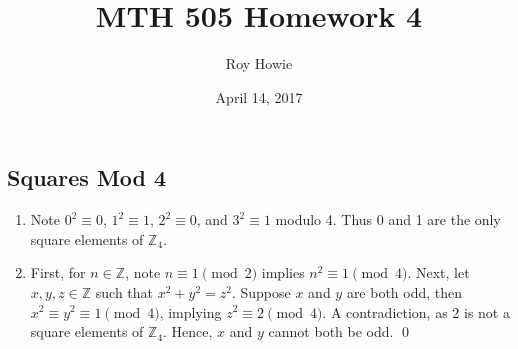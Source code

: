 \documentclass{article}
\newcommand{\Z}{\mathbb{Z}}
\begin{document}
\title{\vspace{-2cm}MTH 505 Homework 4}
\author{Roy Howie}
\date{April 14, 2017}
\maketitle

\subsection{Squares Mod 4}
  \begin{enumerate}[label=\textbf{(\alph*)}]
    \item{
      Note $0^2\equiv0$, $1^2\equiv1$, $2^2\equiv0$, and $3^2\equiv1$ modulo 4.
      Thus 0 and 1 are the only square elements of $\Z_4$.
    }
    \item{
      First, for $n\in\Z$, note $n\equiv1\pmod{2}$ implies $n^2\equiv1\pmod{4}$.
      Next, let $x,y,z\in\Z$ such that $x^2+y^2=z^2$. Suppose $x$ and $y$ are
      both odd, then $x^2\equiv y^2\equiv1\pmod{4}$, implying $z^2\equiv2
      \pmod{4}$. A contradiction, as 2 is not a square elements of $\Z_4$.
      Hence, $x$ and $y$ cannot both be odd.
      \qed
    }
  \end{enumerate}

\end{document}

